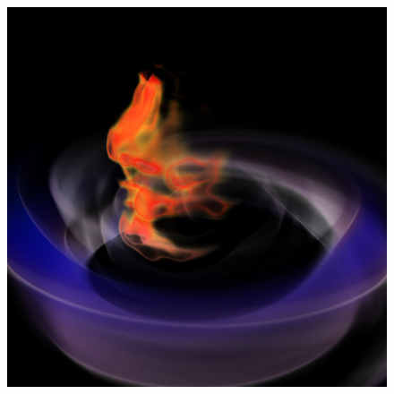 \documentclass{egpubl}
\newlength{\boxheight}
\begin{document}
\begin{figure}[p]
\begin{minipage}[b][\boxheight][b]{0.24\linewidth}
\begin{minipage}[t]{0.98\linewidth}
    \end{minipage}%
    \vfill%
    \begin{minipage}[b]{0.98\linewidth}
      \centering
      \includegraphics[width=\textwidth]{snapshots/space/space-only-vols}
    \end{minipage}%
  \end{minipage}%
  \hfill%
  \usebox\savedProteinBox
  \hfill%
  \begin{minipage}[b][\boxheight][b]{0.24\linewidth}
    \centering%
    \begin{minipage}[t]{0.98\linewidth}
      \centering

\end{minipage}
\end{minipage}
\end{figure}
\end{document}
